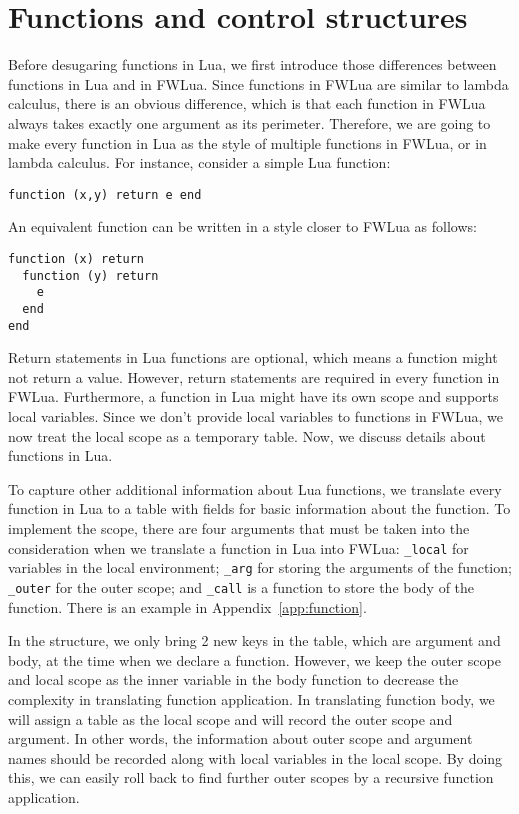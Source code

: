 \section{Functions and control structures}\label{sec:TraFunc}
Before desugaring functions in Lua, we first introduce those differences between functions in Lua and in FWLua. Since functions in FWLua are similar to lambda calculus, there is an obvious difference, which is that each function in FWLua always takes exactly one argument as its perimeter. Therefore, we are going to make every function in Lua as the style of multiple functions in FWLua, or in lambda calculus. For instance, consider a simple Lua function:

\begin{verbatim}
function (x,y) return e end
\end{verbatim}

An equivalent function can be written in a style closer to FWLua as follows:

\begin{verbatim}
function (x) return 
  function (y) return 
    e
  end
end
\end{verbatim}

Return statements in Lua functions are optional, which means a function might not return a value. However, return statements are required in every function in FWLua.
Furthermore, a function in Lua might have its own scope and supports local variables. 
Since we don't provide local variables to functions in FWLua, we now treat the local scope as a temporary table.
Now, we discuss details about functions in Lua.

To capture other additional information about Lua functions, we translate every function in Lua to a table with fields for basic information about the function. To implement the scope, there are four arguments that must be taken into the consideration when we translate a function in Lua into FWLua: {\tt \_local} for variables in the local environment; {\tt \_arg} for storing the arguments of the function; {\tt \_outer} for the outer scope; and {\tt \_call} is a function to store the body of the function. There is an example in Appendix~\ref{app:function}.

In the structure, we only bring 2 new keys in the table, which are argument and body, at the time when we declare a function. However, we keep the outer scope and local scope as the inner variable in the body function to decrease the complexity in translating function application. In translating function body, we will assign a table as the local scope and will record the outer scope and argument. In other words, the information about outer scope and argument names should be recorded along with local variables in the local scope. By doing this, we can easily roll back to find further outer scopes by a recursive function application.

